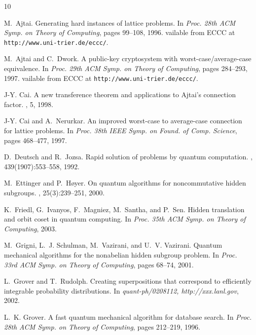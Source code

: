 \documentclass[11pt]{article}
\begin{document}
\begin{thebibliography}{10}

M.~Ajtai.
\newblock Generating hard instances of lattice problems.
\newblock In {\em Proc. 28th ACM Symp. on Theory of Computing}, pages 99--108,
  1996.
vailable from ECCC at {\tt http://www.uni-trier.de/eccc/}.

M.~Ajtai and C.~Dwork.
\newblock A public-key cryptosystem with worst-case/average-case equivalence.
\newblock In {\em Proc. 29th ACM Symp. on Theory of Computing}, pages 284--293,
  1997.
vailable from ECCC at {\tt http://www.uni-trier.de/eccc/}.

J-Y. Cai.
\newblock A new transference theorem and applications to {A}jtai's connection
  factor.
, 5,
  1998.

J-Y. Cai and A.~Nerurkar.
\newblock An improved worst-case to average-case connection for lattice
  problems.
\newblock In {\em Proc. 38th IEEE Symp. on Found. of Comp. Science}, pages
  468--477, 1997.

D.~Deutsch and R.~Jozsa.
\newblock Rapid solution of problems by quantum computation.
, 439(1907):553--558, 1992.

M.~Ettinger and P.~H{\o}yer.
\newblock On quantum algorithms for noncommutative hidden subgroups.
, 25(3):239--251, 2000.

K.~Friedl, G.~Ivanyos, F.~Magniez, M.~Santha, and P.~Sen.
\newblock Hidden translation and orbit coset in quantum computing.
\newblock In {\em Proc. 35th ACM Symp. on Theory of Computing}, 2003.

M.~Grigni, L.~J. Schulman, M.~Vazirani, and U.~V. Vazirani.
\newblock Quantum mechanical algorithms for the nonabelian hidden subgroup
  problem.
\newblock In {\em Proc. 33rd ACM Symp. on Theory of Computing}, pages 68--74,
  2001.

L.~Grover and T.~Rudolph.
\newblock Creating superpositions that correspond to efficiently integrable
  probability distributions.
\newblock In {\em quant-ph/0208112, http://xxx.lanl.gov}, 2002.

L.~K. Grover.
\newblock A fast quantum mechanical algorithm for database search.
\newblock In {\em Proc. 28th ACM Symp. on Theory of Computing}, pages 212--219,
  1996.


\end{thebibliography}
\end{document}
